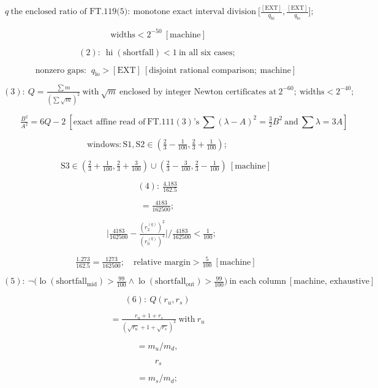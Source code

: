 \begin{theorem}
\[
\ q\ \text{the enclosed ratio of FT.119(5)}:\ \text{monotone exact interval division}\ \bigl[\tfrac{[\mathrm{EXT}]}{q_{\mathrm{hi}}},\tfrac{[\mathrm{EXT}]}{q_{\mathrm{lo}}}\bigr];
\]

\[
\ \text{widths}<2^{-50}\ [\text{machine}]
\]

\[
(2):\ \operatorname{hi}(\text{shortfall})<1\ \text{in all six cases};
\]

\[
\qquad \text{nonzero gaps: }\ q_{\mathrm{lo}}>[\mathrm{EXT}]\ [\text{disjoint rational comparison};\ \text{machine}]
\]

\[
(3):\ Q=\tfrac{\sum m}{(\sum\sqrt m)^2}\ \text{with}\ \sqrt m\ \text{enclosed by integer Newton certificates at}\ 2^{-60};\ \text{widths}<2^{-40};
\]

\[
\qquad \tfrac{B^2}{A^2}=6Q-2\ [\text{exact affine read of}\ \mathrm{FT.111}(3)\text{'s}\ \textstyle\sum(\lambda-A)^2=\tfrac32B^2\ \text{and}\ \sum\lambda=3A]
\]

\[
\text{windows}: \text{S1},\text{S2}\in(\tfrac23-\tfrac1{100},\tfrac23+\tfrac1{100});
\]

\[
\qquad \text{S3}\in(\tfrac23+\tfrac1{100},\tfrac23+\tfrac3{100})\cup(\tfrac23-\tfrac3{100},\tfrac23-\tfrac1{100})\ [\text{machine}]
\]

\[
(4):\ \tfrac{4.183}{162.5}
\]

\[
= \tfrac{4183}{162500};
\]

\[
\quad\bigl|\tfrac{4183}{162500}-\tfrac{(r^{(q)}_2)^2}{(r^{(q)}_0)^2}\bigr|/\tfrac{4183}{162500}<\tfrac1{100};
\]

\[
\qquad \tfrac{1.273}{162.5}=\tfrac{1273}{162500};\quad\text{relative margin}>\tfrac5{100}\ [\text{machine}]
\]

\[
(5):\ \neg\bigl(\operatorname{lo}(\text{shortfall}_{\mathrm{mid}})>\tfrac{99}{100}\wedge\operatorname{lo}(\text{shortfall}_{\mathrm{out}})>\tfrac{99}{100}\bigr)\ \text{in each column}\ [\text{machine, exhaustive}]
\]

\[
(6):\ Q(r_u,r_s)
\]

\[
= \tfrac{r_u+1+r_s}{(\sqrt{r_u}+1+\sqrt{r_s})^2}\ \text{with}\ r_u
\]

\[
= m_u/m_d,
\]

\[
\ r_s
\]

\[
= m_s/m_d;
\]


\end{theorem}
